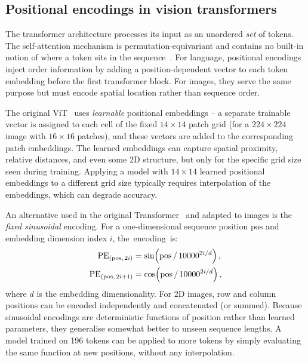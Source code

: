 \subsection{Positional encodings in vision transformers}
\label{sec:prelim-pos-enc}

The transformer architecture processes its input as an unordered \emph{set} of tokens. The self-attention mechanism is permutation-equivariant and contains no built-in notion of where a token sits in the sequence~\cite{vaswani2017attention}. For language, positional encodings inject order information by adding a position-dependent vector to each token embedding before the first transformer block. For images, they serve the same purpose but must encode spatial location rather than sequence order.

The original ViT~\cite{dosovitskiy2021image} uses \emph{learnable} positional embeddings -- a separate trainable vector is assigned to each cell of the fixed $14\times14$ patch grid (for a $224\times224$ image with $16\times16$ patches), and these vectors are added to the corresponding patch embeddings. The learned embeddings can capture spatial proximity, relative distances, and even some 2D structure, but only for the specific grid size seen during training. Applying a model with $14\times14$ learned positional embeddings to a different grid size typically requires interpolation of the embeddings, which can degrade accuracy.

An alternative used in the original Transformer~\cite{vaswani2017attention} and adapted to images is the \emph{fixed sinusoidal} encoding. For a one-dimensional sequence position $\mathrm{pos}$ and embedding dimension index $i$, the~encoding~is:
\begin{align}
    \mathrm{PE}_{(\mathrm{pos},\,2i)} &= \sin\!\left(\mathrm{pos}\,/\,10000^{2i/d}\right), \notag \\
    \mathrm{PE}_{(\mathrm{pos},\,2i+1)} &= \cos\!\left(\mathrm{pos}\,/\,10000^{2i/d}\right),
    \label{eq:sincos-enc}
\end{align}
where $d$ is the embedding dimensionality. For 2D images, row and column positions can be encoded independently and concatenated (or summed). Because sinusoidal encodings are deterministic functions of position rather than learned parameters, they generalise somewhat better to unseen sequence lengths. A model trained on 196 tokens can be applied to more tokens by simply evaluating the same function at new positions, without any interpolation.

